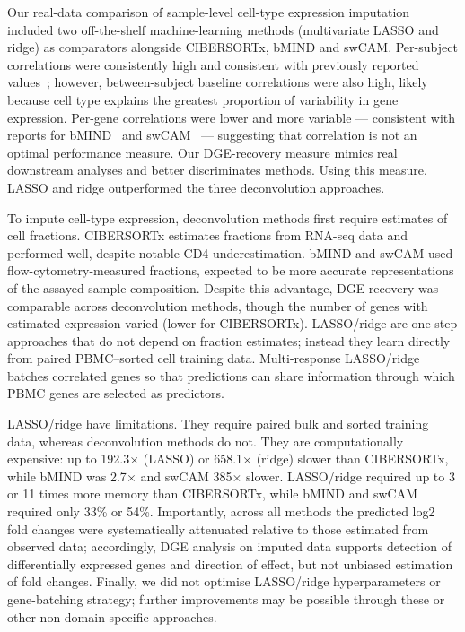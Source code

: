 \documentclass[11pt]{article}
\begin{document}
Our real-data comparison of sample-level cell-type expression imputation included two off-the-shelf machine-learning methods (multivariate LASSO and ridge) as comparators alongside CIBERSORTx, bMIND and swCAM. Per-subject correlations were consistently high and consistent with previously reported values~\citep{newman2019cibersortx,wang2021bmind,chen2022swcam}; however, between-subject baseline correlations were also high, likely because cell type explains the greatest proportion of variability in gene expression. Per-gene correlations were lower and more variable --- consistent with reports for bMIND~\citep{wang2021bmind} and swCAM~\citep{chen2022swcam} --- suggesting that correlation is not an optimal performance measure. Our DGE-recovery measure mimics real downstream analyses and better discriminates methods. Using this measure, LASSO and ridge outperformed the three deconvolution approaches.

To impute cell-type expression, deconvolution methods first require estimates of cell fractions. CIBERSORTx estimates fractions from RNA-seq data and performed well, despite notable CD4 underestimation. bMIND and swCAM used flow-cytometry-measured fractions, expected to be more accurate representations of the assayed sample composition. Despite this advantage, DGE recovery was comparable across deconvolution methods, though the number of genes with estimated expression varied (lower for CIBERSORTx). LASSO/ridge are one-step approaches that do not depend on fraction estimates; instead they learn directly from paired PBMC--sorted cell training data. Multi-response LASSO/ridge batches correlated genes so that predictions can share information through which PBMC genes are selected as predictors.

LASSO/ridge have limitations. They require paired bulk and sorted training data, whereas deconvolution methods do not. They are computationally expensive: up to 192.3$\times$ (LASSO) or 658.1$\times$ (ridge) slower than CIBERSORTx, while bMIND was 2.7$\times$ and swCAM 385$\times$ slower. LASSO/ridge required up to 3 or 11 times more memory than CIBERSORTx, while bMIND and swCAM required only 33\% or 54\%. Importantly, across all methods the predicted log2 fold changes were systematically attenuated relative to those estimated from observed data; accordingly, DGE analysis on imputed data supports detection of differentially expressed genes and direction of effect, but not unbiased estimation of fold changes. Finally, we did not optimise LASSO/ridge hyperparameters or gene-batching strategy; further improvements may be possible through these or other non-domain-specific approaches.



\end{document}

